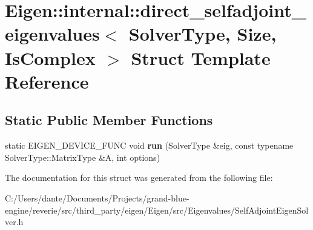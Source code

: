 \hypertarget{struct_eigen_1_1internal_1_1direct__selfadjoint__eigenvalues}{}\section{Eigen\+::internal\+::direct\+\_\+selfadjoint\+\_\+eigenvalues$<$ Solver\+Type, Size, Is\+Complex $>$ Struct Template Reference}
\label{struct_eigen_1_1internal_1_1direct__selfadjoint__eigenvalues}
\subsection*{Static Public Member Functions}
\begin{DoxyCompactItemize}
\item 
\mbox{\label{struct_eigen_1_1internal_1_1direct__selfadjoint__eigenvalues_afbde78285f513af91c6f0430f005759a}} 
static E\+I\+G\+E\+N\+\_\+\+D\+E\+V\+I\+C\+E\+\_\+\+F\+U\+NC void {\bfseries run} (Solver\+Type \&eig, const typename Solver\+Type\+::\+Matrix\+Type \&A, int options)
\end{DoxyCompactItemize}


The documentation for this struct was generated from the following file\+:\begin{DoxyCompactItemize}
\item 
C\+:/\+Users/dante/\+Documents/\+Projects/grand-\/blue-\/engine/reverie/src/third\+\_\+party/eigen/\+Eigen/src/\+Eigenvalues/Self\+Adjoint\+Eigen\+Solver.\+h\end{DoxyCompactItemize}
